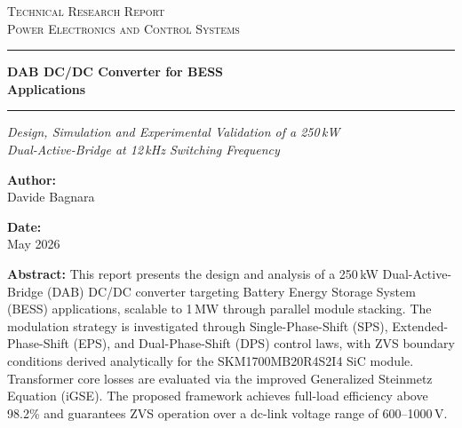 \documentclass[12pt, a4paper]{article}
\newcommand{\DocCategory}{Technical Research Report}
\newcommand{\DocField}{Power Electronics and Control Systems}
\newcommand{\DocTitle}{%
    DAB DC/DC Converter for BESS \\[12pt]
    Applications
}
\newcommand{\DocSubtitle}{%
    Design, Simulation and Experimental Validation of a 250\,kW\\
    Dual-Active-Bridge at 12\,kHz Switching Frequency
}
\newcommand{\DocAuthor}{Davide Bagnara}
\newcommand{\DocDate}{May 2026}
\newcommand{\DocAbstract}{%
    This report presents the design and analysis of a 250\,kW
    Dual-Active-Bridge (DAB) DC/DC converter targeting Battery Energy
    Storage System (BESS) applications, scalable to 1\,MW through parallel
    module stacking. The modulation strategy is investigated through
    Single-Phase-Shift (SPS), Extended-Phase-Shift (EPS), and
    Dual-Phase-Shift (DPS) control laws, with ZVS boundary conditions
    derived analytically for the SKM1700MB20R4S2I4 SiC module.
    Transformer core losses are evaluated via the improved Generalized
    Steinmetz Equation (iGSE). The proposed framework achieves full-load
    efficiency above 98.2\% and guarantees ZVS operation over a dc-link
    voltage range of 600--1000\,V.
}
\begin{document}
\begin{center}
    {\Large\scshape \DocCategory}\\[8pt]
    {\large\scshape \DocField}
\end{center}

\vspace{36pt}
\noindent\rule{\linewidth}{0.8pt}

\begin{center}
    {\fontsize{30}{30}\selectfont\bfseries \DocTitle}
\end{center}

\vspace{4pt}
\noindent\rule{\linewidth}{2.2pt}

\begin{center}
	\begin{onehalfspace}
    	{\large\itshape \DocSubtitle}
    \end{onehalfspace}
\end{center}

\vspace{36pt}

\begin{minipage}{0.92\linewidth}
\noindent
\begin{minipage}[t]{0.48\linewidth}
    \textbf{Author:}\\[2pt]
    \DocAuthor
\end{minipage}%
\hfill
\begin{minipage}[t]{0.48\linewidth}
    \raggedleft
    \textbf{Date:}\\[2pt]
    \DocDate
\end{minipage}
\end{minipage}
\vspace{72pt}

\begin{center}
\begin{minipage}{0.85\linewidth}
    \footnotesize 
    \begin{onehalfspace}
    	\textbf{Abstract:} \DocAbstract
    \end{onehalfspace}
\end{minipage}
\end{center}
\end{document}
